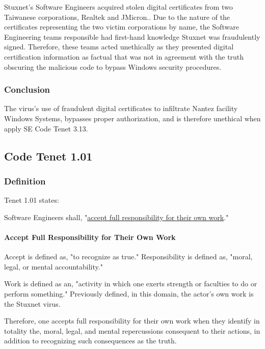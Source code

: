 \documentclass[12pt]{article}
\begin{document}
\begin{multicols}{2}
Stuxnet's Software Engineers acquired stolen digital certificates from two Taiwanese corporations, Realtek and JMicron.\cite{signedUsingCertificates}. Due to the nature of the certificates representing the two victim corporations by name, the Software Engineering teams responsible had first-hand knowledge Stuxnet was fraudulently signed. Therefore, these teams acted unethically as they presented digital certification information as factual that was not in agreement with the truth obscuring the malicious code to bypass Windows security procedures.

\subsubsection{Conclusion}

The virus's use of fraudulent digital certificates to infiltrate Nantez facility Windows Systems, bypasses proper authorization, and is therefore unethical when apply SE Code Tenet 3.13.\newpage

\subsection{Code Tenet 1.01}

\subsubsection{Definition}

Tenet 1.01 states:

\begin{framed}
Software Engineers shall, "\ul{accept full responsibility for their own work}."\cite{softwareEngineeringCodeOfEthics}
\end{framed}

\paragraph{Accept Full Responsibility for Their Own Work}

Accept is defined as, "to recognize as true."\cite{merriamWebsterDefinitions} Responsibility is defined as, "moral, legal, or mental accountability."\cite{merriamWebsterDefinitions}

Work is defined as an, "activity in which one exerts strength or faculties to do or perform something."\cite{cambridgeDictionary} Previously defined, in this domain, the actor's own work is the Stuxnet virus.

Therefore, one accepts full responsibility for their own work when they identify in totality the, moral, legal, and mental repercussions consequent to their actions, in addition to recognizing such consequences as the truth.\cite{cambridgeDictionary}


\end{multicols}
\end{document}
